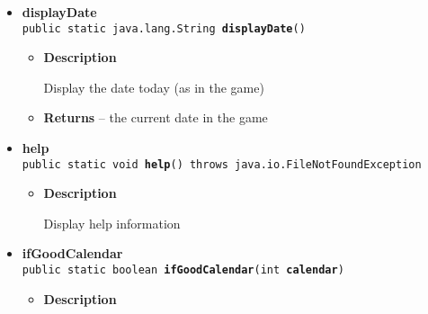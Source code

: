 {{{{{\begin{itemize}
{\begin{itemize}
{Break lines in a long string to make display nicer\\ref: \url{http://stackoverflow.com/questions/7528045/large-string-split-into- lines-with-maximum-length-in-java}
}
\item{
{\bf  Parameters}
  \begin{itemize}
   \item{
\texttt{input} -- the string need to be broken}
   \item{
\texttt{maxLineLength} -- the maxium line length to insert break line}
  \end{itemize}
}%
\item{{\bf  Returns} -- 
the string with proper breaks 
}%
\end{itemize}
}%
\item{ 
{\bf  displayDate}\\
\texttt{public static java.lang.String\ {\bf  displayDate}()
\label{personOfInterest.Game.displayDate()}}%
\begin{itemize}
\item{
{\bf  Description}

Display the date today (as in the game)
}
\item{{\bf  Returns} -- 
the current date in the game 
}%
\end{itemize}
}%
\item{ 
{\bf  help}\\
\texttt{public static void\ {\bf  help}() throws java.io.FileNotFoundException
\label{personOfInterest.Game.help()}}%
\begin{itemize}
\item{
{\bf  Description}

Display help information
}
\end{itemize}
}%
\item{ 
{\bf  ifGoodCalendar}\\
\texttt{public static boolean\ {\bf  ifGoodCalendar}(\texttt{int\lbrack \rbrack } {\bf  calendar})
\label{personOfInterest.Game.ifGoodCalendar(int[])}}%
\begin{itemize}
\item{
{\bf  Description}

}
\end{itemize}}
\end{itemize}}}}}}
